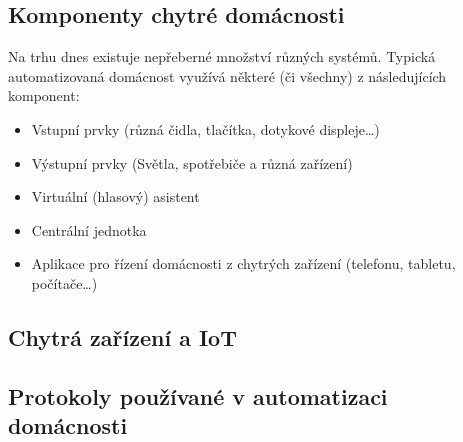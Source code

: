 \subsection*{Komponenty chytré domácnosti}
Na trhu dnes existuje nepřeberné množství různých systémů. Typická automatizovaná domácnost využívá některé (či všechny) z následujících komponent: \newline

\begin{itemize}
\item Vstupní prvky (různá čidla, tlačítka, dotykové displeje…)
\item Výstupní prvky (Světla, spotřebiče a různá zařízení)
\item Virtuální (hlasový) asistent
\item Centrální jednotka
\item Aplikace pro řízení domácnosti z chytrých zařízení (telefonu, tabletu, počítače…)
\end{itemize}

\subsection*{Chytrá zařízení a IoT}

\subsection*{Protokoly používané v automatizaci domácnosti}


